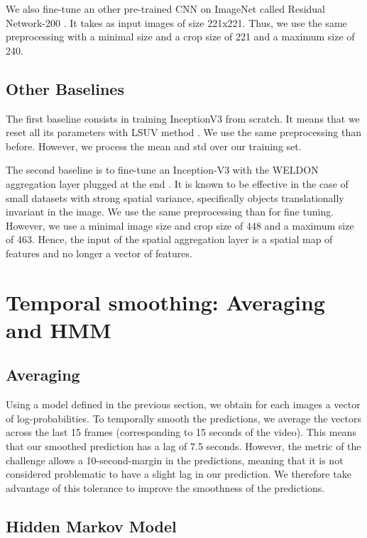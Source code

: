 \documentclass[10pt,twocolumn,letterpaper]{article}
\begin{document}
We also fine-tune an other pre-trained CNN on ImageNet called Residual Network-200 \cite{he2016deep}. It takes as input images of size 221x221. Thus, we use the same preprocessing with a minimal size and a crop size of 221 and a maximum size of 240.


\subsection{Other Baselines}

The first baseline consists in training InceptionV3 from scratch. It means that we reset all its parameters with LSUV method \cite{LSUVInit2015}. We use the same preprocessing than before. However, we process the mean and std over our training set.

The second baseline is to fine-tune an Inception-V3 with the WELDON aggregation layer plugged at the end \cite{durand2016weldon}.
It is known to be effective in the case of small datasets with strong spatial variance, specifically objects translationally invariant in the image.
We use the same preprocessing than for fine tuning. However, we use a minimal image size and crop size of 448 and a maximum size of 463. Hence, the input of the spatial aggregation layer is a spatial map of features and no longer a vector of features.


\section{Temporal smoothing: Averaging and HMM}

\subsection{Averaging}

Using a model defined in the previous section, we obtain for each images a vector of log-probabilities.
To temporally smooth the predictions, we average the vectors across the
last 15 frames (corresponding to 15 seconds of the video). This means that our
smoothed prediction has a lag of 7.5 seconds. However, the metric of the challenge
allows a 10-second-margin in the predictions, meaning that it is not considered
problematic to have a slight lag in our prediction. We therefore take advantage
of this tolerance to improve the smoothness of the predictions.

\subsection{Hidden Markov Model}
\end{document}
